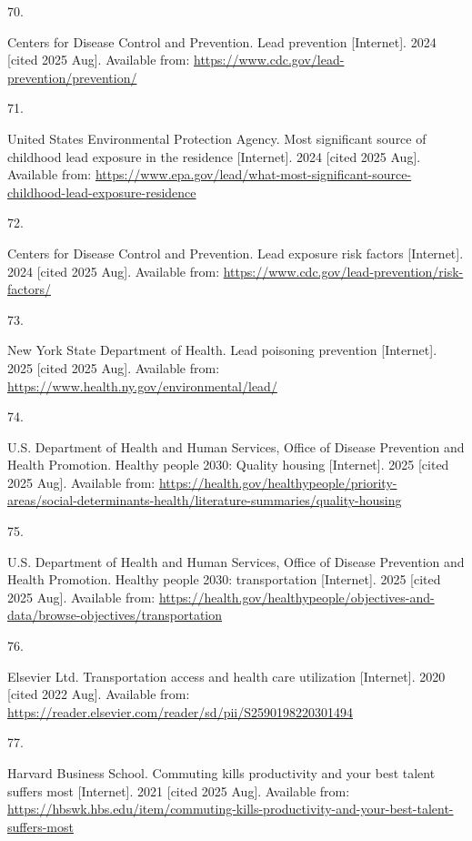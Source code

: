 \documentclass[
  english,
  letterpaper,
]{report}
\newlength{\cslhangindent}
\newlength{\csllabelwidth}
\newenvironment{CSLReferences}[2] %
 {\begin{list}{}{%
  \setlength{\itemindent}{0pt}
  \setlength{\leftmargin}{0pt}
  \setlength{\parsep}{0pt}
  \ifodd #1
   \setlength{\leftmargin}{\cslhangindent}
   \setlength{\itemindent}{-1\cslhangindent}
  \fi
  \setlength{\itemsep}{#2\baselineskip}}}
 {\end{list}}
\newcommand{\CSLLeftMargin}[1]{\parbox[t]{\csllabelwidth}{\strut#1\strut}}
\newcommand{\CSLRightInline}[1]{\parbox[t]{\linewidth - \csllabelwidth}{\strut#1\strut}}
\begin{document}
\begin{CSLReferences}{0}{1}
\CSLLeftMargin{70. }%
\CSLRightInline{Centers for Disease Control and Prevention. Lead
prevention {[}Internet{]}. 2024 {[}cited 2025 Aug{]}. Available from:
\url{https://www.cdc.gov/lead-prevention/prevention/}}

\CSLLeftMargin{71. }%
\CSLRightInline{United States Environmental Protection Agency. Most
significant source of childhood lead exposure in the residence
{[}Internet{]}. 2024 {[}cited 2025 Aug{]}. Available from:
\url{https://www.epa.gov/lead/what-most-significant-source-childhood-lead-exposure-residence}}

\CSLLeftMargin{72. }%
\CSLRightInline{Centers for Disease Control and Prevention. Lead
exposure risk factors {[}Internet{]}. 2024 {[}cited 2025 Aug{]}.
Available from: \url{https://www.cdc.gov/lead-prevention/risk-factors/}}

\CSLLeftMargin{73. }%
\CSLRightInline{New York State Department of Health. Lead poisoning
prevention {[}Internet{]}. 2025 {[}cited 2025 Aug{]}. Available from:
\url{https://www.health.ny.gov/environmental/lead/}}

\CSLLeftMargin{74. }%
\CSLRightInline{U.S. Department of Health and Human Services, Office of
Disease Prevention and Health Promotion. Healthy people 2030: Quality
housing {[}Internet{]}. 2025 {[}cited 2025 Aug{]}. Available from:
\url{https://health.gov/healthypeople/priority-areas/social-determinants-health/literature-summaries/quality-housing}}

\CSLLeftMargin{75. }%
\CSLRightInline{U.S. Department of Health and Human Services, Office of
Disease Prevention and Health Promotion. Healthy people 2030:
transportation {[}Internet{]}. 2025 {[}cited 2025 Aug{]}. Available
from:
\url{https://health.gov/healthypeople/objectives-and-data/browse-objectives/transportation}}

\CSLLeftMargin{76. }%
\CSLRightInline{Elsevier Ltd. Transportation access and health care
utilization {[}Internet{]}. 2020 {[}cited 2022 Aug{]}. Available from:
\url{https://reader.elsevier.com/reader/sd/pii/S2590198220301494}}

\CSLLeftMargin{77. }%
\CSLRightInline{Harvard Business School. Commuting kills productivity
and your best talent suffers most {[}Internet{]}. 2021 {[}cited 2025
Aug{]}. Available from:
\url{https://hbswk.hbs.edu/item/commuting-kills-productivity-and-your-best-talent-suffers-most}}


\end{CSLReferences}
\end{document}
